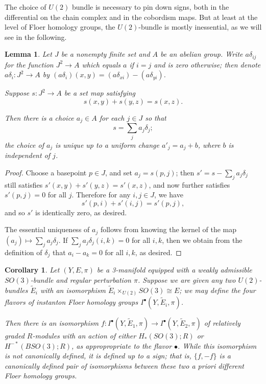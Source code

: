 \documentclass[10pt,a4paper]{amsart}
\newtheorem{lemma}[theorem]{Lemma}
\newtheorem{corollary}[theorem]{Corollary}
\theoremstyle{definition}
\theoremstyle{remark}
\numberwithin{figure}{qchap}
\begin{document}
The choice of $U(2)$ bundle is necessary to pin down signs, both in the differential on the chain complex and in the cobordism maps. But at least at the level of Floer homology groups, the $U(2)$-bundle is mostly inessential, as we will see in the following.

\begin{lemma}\label{Cocycle}Let $J$ be a nonempty finite set and $A$ be an abelian group. Write $a\delta_{ij}$ for the function $J^2 \to A$ which equals $a$ if $i = j$ and is zero otherwise; then denote
$a \delta_i: J^2 \to A$ by $(a\delta_i)(x,y) = (a\delta_{xi}) - (a\delta_{yi})$.

Suppose $s: J^2 \to A$ be a set map satisfying $$s(x,y) + s(y,z) = s(x,z).$$ 

Then there is a choice $a_j \in A$ for each $j \in J$ so that $$s = \sum_j a_j \delta_j;$$ the choice of $a_j$ is unique up to a uniform change $a'_j = a_j + b$, where $b$ is independent of $j$. 
\end{lemma}
\begin{proof}Choose a basepoint $p \in J$, and set $a_j = s(p,j)$; then $s' = s - \sum_j a_j \delta_j$ still satisfies $s'(x,y) + s'(y,z) = s'(x,z)$, and now further satisfies $s'(p,j) = 0$ for all $j$. Therefore for any $i,j \in J$, we have $$s'(p,i) + s'(i,j) = s'(p,j),$$ and so $s'$ is identically zero, as desired.

The essential uniqueness of $a_j$ follows from knowing the kernel of the map $(a_j) \mapsto \sum_j a_j \delta_j$. If $\sum_j a_j \delta_j(i,k) = 0$ for all $i,k$, then we obtain from the definition of $\delta_j$ that $a_i - a_k = 0$ for all $i,k$, as desired.
\end{proof}

\begin{corollary}\label{no-u2}Let $(Y,E,\pi)$ be a 3-manifold equipped with a weakly admissible $SO(3)$-bundle and regular perturbation $\pi$. Suppose we are given any two $U(2)$-bundles $\tilde E_i$ with an isomorphism $\tilde E_i \times_{U(2)} SO(3) \cong E$; we may define the four flavors of instanton Floer homology groups $I^\bullet(Y,\tilde E_i,\pi)$. 

Then there is an isomorphism $f: I^\bullet(Y,\tilde E_1, \pi) \to I^\bullet(Y, \tilde E_2, \pi)$ of relatively graded $R$-modules with an action of either $H_*(SO(3);R)$ or $H^{-*}(BSO(3);R)$, as appropropriate to the flavor $\bullet$. While this isomorphism is not canonically defined, it is defined up to a sign; that is, $\{f, -f\}$ is a canonically defined pair of isomorphisms between these two a priori different Floer homology groups.
\end{corollary}
\end{document}
